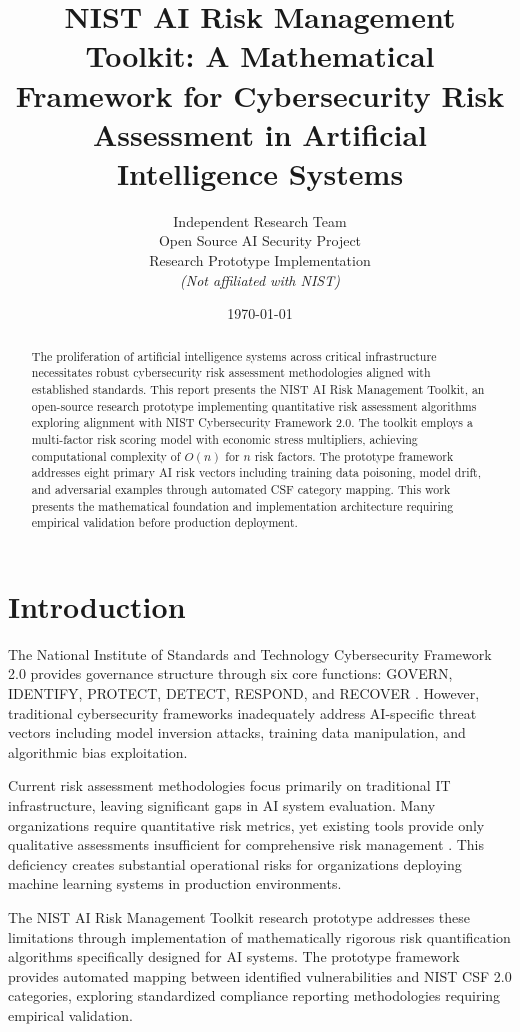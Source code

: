 \documentclass[11pt,letterpaper]{article}
\title{\textbf{NIST AI Risk Management Toolkit: A Mathematical Framework for Cybersecurity Risk Assessment in Artificial Intelligence Systems}}
\author{
Independent Research Team\\
Open Source AI Security Project\\
Research Prototype Implementation\\
\textit{(Not affiliated with NIST)}
}
\date{\today}
\begin{document}
\maketitle

\begin{abstract}
The proliferation of artificial intelligence systems across critical infrastructure necessitates robust cybersecurity risk assessment methodologies aligned with established standards. This report presents the NIST AI Risk Management Toolkit, an open-source research prototype implementing quantitative risk assessment algorithms exploring alignment with NIST Cybersecurity Framework 2.0. The toolkit employs a multi-factor risk scoring model with economic stress multipliers, achieving computational complexity of $O(n)$ for $n$ risk factors. The prototype framework addresses eight primary AI risk vectors including training data poisoning, model drift, and adversarial examples through automated CSF category mapping. This work presents the mathematical foundation and implementation architecture requiring empirical validation before production deployment.
\end{abstract}

\section{Introduction}

The National Institute of Standards and Technology Cybersecurity Framework 2.0 provides governance structure through six core functions: GOVERN, IDENTIFY, PROTECT, DETECT, RESPOND, and RECOVER \cite{NISTCSF20}. However, traditional cybersecurity frameworks inadequately address AI-specific threat vectors including model inversion attacks, training data manipulation, and algorithmic bias exploitation.

Current risk assessment methodologies focus primarily on traditional IT infrastructure, leaving significant gaps in AI system evaluation. Many organizations require quantitative risk metrics, yet existing tools provide only qualitative assessments insufficient for comprehensive risk management \cite{FISMA2014}. This deficiency creates substantial operational risks for organizations deploying machine learning systems in production environments.

The NIST AI Risk Management Toolkit research prototype addresses these limitations through implementation of mathematically rigorous risk quantification algorithms specifically designed for AI systems. The prototype framework provides automated mapping between identified vulnerabilities and NIST CSF 2.0 categories, exploring standardized compliance reporting methodologies requiring empirical validation.
\end{document}
